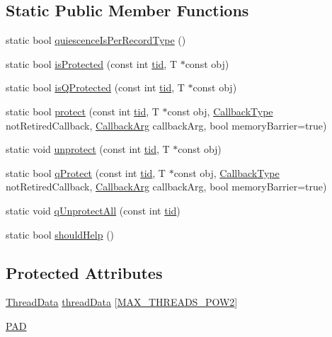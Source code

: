 \subsection*{Static Public Member Functions}
\begin{DoxyCompactItemize}
\item 
static bool \hyperlink{classreclaimer__ebr__token_a04a36547ffd9692aefe0f2a7cc16c15f}{quiescence\+Is\+Per\+Record\+Type} ()
\item 
static bool \hyperlink{classreclaimer__ebr__token_ae806d7fcc13bb4d7eb5a447a85d2950d}{is\+Protected} (const int \hyperlink{microbench_2main_8cpp_a9ca9869868fe7e7a38a921cc7de4103f}{tid}, T $\ast$const obj)
\item 
static bool \hyperlink{classreclaimer__ebr__token_ac4a89ebcacf0b057041322aa1a677c42}{is\+Q\+Protected} (const int \hyperlink{microbench_2main_8cpp_a9ca9869868fe7e7a38a921cc7de4103f}{tid}, T $\ast$const obj)
\item 
static bool \hyperlink{classreclaimer__ebr__token_a5352c8afe5e576ab0a6370d2c3fa1752}{protect} (const int \hyperlink{microbench_2main_8cpp_a9ca9869868fe7e7a38a921cc7de4103f}{tid}, T $\ast$const obj, \hyperlink{globals_8h_a57f5c0d40b156d7d996492fb2f16e3cd}{Callback\+Type} not\+Retired\+Callback, \hyperlink{globals_8h_a3de64ef48066ac6430631c8b81a15345}{Callback\+Arg} callback\+Arg, bool memory\+Barrier=true)
\item 
static void \hyperlink{classreclaimer__ebr__token_aa43f00d8adc9cefeb604c14f0af45083}{unprotect} (const int \hyperlink{microbench_2main_8cpp_a9ca9869868fe7e7a38a921cc7de4103f}{tid}, T $\ast$const obj)
\item 
static bool \hyperlink{classreclaimer__ebr__token_a894dfb4d02dc74c9d9ee23329bdce9e2}{q\+Protect} (const int \hyperlink{microbench_2main_8cpp_a9ca9869868fe7e7a38a921cc7de4103f}{tid}, T $\ast$const obj, \hyperlink{globals_8h_a57f5c0d40b156d7d996492fb2f16e3cd}{Callback\+Type} not\+Retired\+Callback, \hyperlink{globals_8h_a3de64ef48066ac6430631c8b81a15345}{Callback\+Arg} callback\+Arg, bool memory\+Barrier=true)
\item 
static void \hyperlink{classreclaimer__ebr__token_a0bada18048e62e6d92906fca905f2fe6}{q\+Unprotect\+All} (const int \hyperlink{microbench_2main_8cpp_a9ca9869868fe7e7a38a921cc7de4103f}{tid})
\item 
static bool \hyperlink{classreclaimer__ebr__token_ae3f31ec8fd28eeaaa86ca58fcfe9ca64}{should\+Help} ()
\end{DoxyCompactItemize}
\subsection*{Protected Attributes}
\begin{DoxyCompactItemize}
\item 
\hyperlink{classreclaimer__ebr__token_1_1ThreadData}{Thread\+Data} \hyperlink{classreclaimer__ebr__token_a321a12296aabc232eb2cabbba1164b14}{thread\+Data} \mbox{[}\hyperlink{plaf_8h_ac1585a3455dd3e33e877e588be9e466b}{M\+A\+X\+\_\+\+T\+H\+R\+E\+A\+D\+S\+\_\+\+P\+O\+W2}\mbox{]}
\item 
\hyperlink{classreclaimer__ebr__token_a73eb1600dc86a4999e9ce31b07076f97}{P\+AD}
\end{DoxyCompactItemize}
